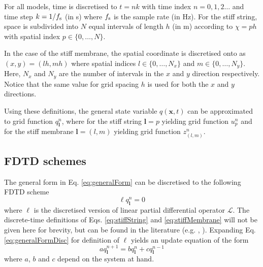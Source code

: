 \documentclass{article}
\begin{document}

For all models, time is discretised to $t = nk$ with time index $n = 0, 1, 2 \hdots$ and time step $k = 1/f_\text{s}$ (in s) where $f_\text{s}$ is the sample rate (in Hz). For the stiff string, space is subdivided into $N$ equal intervals of length $h$ (in m) according to $\chi = p h$ with spatial index $p \in \{0, \hdots, N\}$. 

In the case of the stiff membrane, the spatial coordinate is discretised onto  as $(x, y) = (l h, m h)$ where spatial indices $l \in \{0, \hdots, N_x\}$ and $m\in\{0, \hdots, N_y\}$. Here, $N_x$ and $N_y$ are the number of intervals in the $x$ and $y$ direction respectively. Notice that the same value for grid spacing $h$ is used for both the $x$ and $y$ directions. 

Using these definitions, the general state variable $q(\boldsymbol{x}, t)$ can be approximated to grid function $q_{\boldsymbol{l}}^n$, where for the stiff string $\boldsymbol{l} = p$ yielding grid function $u_p^n$ and for the stiff membrane $\boldsymbol{l} = (l, m)$ yielding grid function $z_{(l,m)}^n$.

\subsection{FDTD schemes}
The general form in Eq. \eqref{eq:generalForm} can be discretised to the following FDTD scheme
\begin{equation}\label{eq:generalFormDisc}
    \ell q_{\boldsymbol{l}}^n = 0
\end{equation}
where $\ell$ is the discretised version of linear partial differential operator $\mathcal{L}$. The discrete-time definitions of Eqs. \eqref{eq:stiffString} and \eqref{eq:stiffMembrane} will not be given here for brevity, but can be found in the literature (e.g. \cite{theBible}, \cite{WillemsenThesis}). Expanding Eq. \eqref{eq:generalFormDisc} for definition of $\ell$ yields an update equation of the form
\begin{equation}
    a q_{\boldsymbol{l}}^{n+1} = b q_{\boldsymbol{l}}^n + c q_{\boldsymbol{l}}^{n-1}
\end{equation}
where $a$, $b$ and $c$ depend on the system at hand. 
\end{document}
